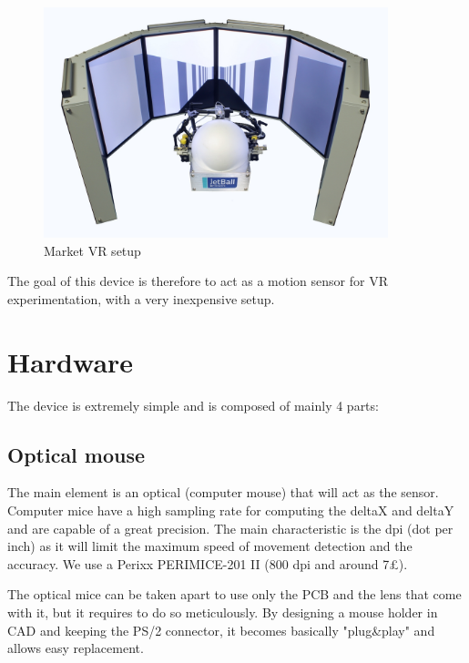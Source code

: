 \documentclass[a4paper]{article}
\begin{document}
\begin{figure}[h!]
    \centering
    \includegraphics[width = 10cm]{images/VR.jpg}
    \caption{Market VR setup}
    \label{fig:vr}
\end{figure}


The goal of this device is therefore to act as a motion sensor for VR experimentation, with a very inexpensive setup.

\section{Hardware}
The device is extremely simple and is composed of mainly 4 parts:
\subsection{Optical mouse}
The main element is an optical (computer mouse) that will act as the sensor.
Computer mice have a high sampling rate for computing the deltaX and deltaY and are capable of a great precision.
The main characteristic is the dpi (dot per inch) as it will limit the maximum speed of movement detection and the accuracy. 
We use a Perixx PERIMICE-201 II (800 dpi and around 7£).

The optical mice can be taken apart to use only the PCB and the lens that come with it, but it requires to do so meticulously. By designing a mouse holder in CAD and keeping the PS/2 connector, it becomes basically "plug\&play" and allows easy replacement.
\end{document}
